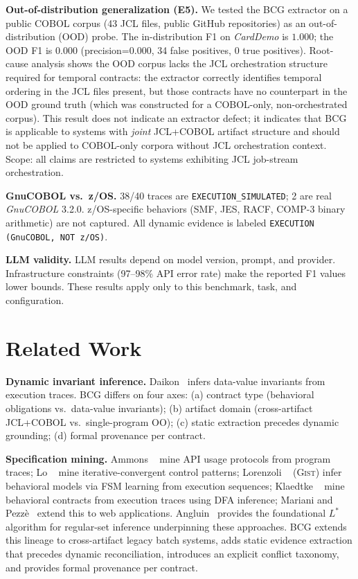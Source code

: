 \documentclass[sigconf,anonymous,review]{acmart}
\newcommand{\carddemo}{\textit{CardDemo}\xspace}
\newcommand{\gnucobol}{\textit{GnuCOBOL}\xspace}
\begin{document}
\textbf{Out-of-distribution generalization (E5).}
We tested the BCG extractor on a public COBOL corpus (43 JCL files, public GitHub
repositories) as an out-of-distribution (OOD) probe.
The in-distribution F1 on \carddemo is $1.000$; the OOD F1 is $0.000$
(precision=$0.000$, 34 false positives, 0 true positives).
Root-cause analysis shows the OOD corpus lacks the JCL orchestration structure
required for temporal contracts: the extractor correctly identifies temporal
ordering in the JCL files present, but those contracts have no counterpart in the
OOD ground truth (which was constructed for a COBOL-only, non-orchestrated corpus).
This result does not indicate an extractor defect; it indicates that BCG is
applicable to systems with \emph{joint} JCL+COBOL artifact structure and should
not be applied to COBOL-only corpora without JCL orchestration context.
Scope: all claims are restricted to systems exhibiting JCL job-stream orchestration.

\textbf{GnuCOBOL vs.\ z/OS.}
38/40 traces are \texttt{EXECUTION\_SIMULATED}; 2 are real \gnucobol 3.2.0.
z/OS-specific behaviors (SMF, JES, RACF, COMP-3 binary arithmetic) are not captured.
All dynamic evidence is labeled \texttt{EXECUTION (GnuCOBOL, NOT z/OS)}.

\textbf{LLM validity.}
LLM results depend on model version, prompt, and provider.
Infrastructure constraints (97--98\% API error rate) make the reported F1 values
lower bounds.
These results apply only to this benchmark, task, and configuration.

\section{Related Work}\label{sec:related}

\textbf{Dynamic invariant inference.}
Daikon~\cite{ernst2007daikon} infers data-value invariants from execution traces.
BCG differs on four axes: (a) contract type (behavioral obligations vs.\ data-value
invariants); (b) artifact domain (cross-artifact JCL+COBOL vs.\ single-program OO);
(c) static extraction precedes dynamic grounding; (d) formal provenance per contract.

\textbf{Specification mining.}
Ammons \etal~\cite{ammons2002mining} mine API usage protocols from program traces;
Lo \etal~\cite{lo2006mining} mine iterative-convergent control patterns;
Lorenzoli \etal~\cite{lorenzoli2008automatic} (\textsc{Gist}) infer behavioral
models via FSM learning from execution sequences;
Klaedtke \etal~\cite{klaedtke2021mining} mine behavioral contracts from execution
traces using DFA inference;
Mariani and Pezz\`{e}~\cite{mariani2012behavioural} extend this to web applications.
Angluin~\cite{angluin1987learning} provides the foundational $L^*$ algorithm
for regular-set inference underpinning these approaches.
BCG extends this lineage to cross-artifact legacy batch systems, adds static
evidence extraction that precedes dynamic reconciliation, introduces an explicit
conflict taxonomy, and provides formal provenance per contract.
\end{document}
